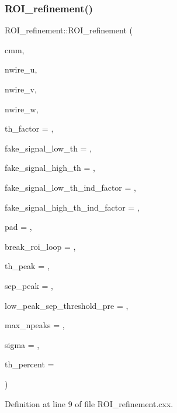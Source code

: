\subsubsection{\texorpdfstring{R\+O\+I\+\_\+refinement()}{ROI\_refinement()}}
{\footnotesize\ttfamily R\+O\+I\+\_\+refinement\+::\+R\+O\+I\+\_\+refinement (\begin{DoxyParamCaption}\item[{\hyperlink{namespace_wire_cell_1_1_waveform_a18b9ae61c858e340252ba3ac83ac3bc0}{Waveform\+::\+Channel\+Mask\+Map} \&}]{cmm,  }\item[{int}]{nwire\+\_\+u,  }\item[{int}]{nwire\+\_\+v,  }\item[{int}]{nwire\+\_\+w,  }\item[{float}]{th\+\_\+factor = {},  }\item[{float}]{fake\+\_\+signal\+\_\+low\+\_\+th = {},  }\item[{float}]{fake\+\_\+signal\+\_\+high\+\_\+th = {},  }\item[{float}]{fake\+\_\+signal\+\_\+low\+\_\+th\+\_\+ind\+\_\+factor = {},  }\item[{float}]{fake\+\_\+signal\+\_\+high\+\_\+th\+\_\+ind\+\_\+factor = {},  }\item[{int}]{pad = {},  }\item[{int}]{break\+\_\+roi\+\_\+loop = {},  }\item[{float}]{th\+\_\+peak = {},  }\item[{float}]{sep\+\_\+peak = {},  }\item[{float}]{low\+\_\+peak\+\_\+sep\+\_\+threshold\+\_\+pre = {},  }\item[{int}]{max\+\_\+npeaks = {},  }\item[{float}]{sigma = {},  }\item[{float}]{th\+\_\+percent = {} }\end{DoxyParamCaption})}



Definition at line 9 of file R\+O\+I\+\_\+refinement.\+cxx.


